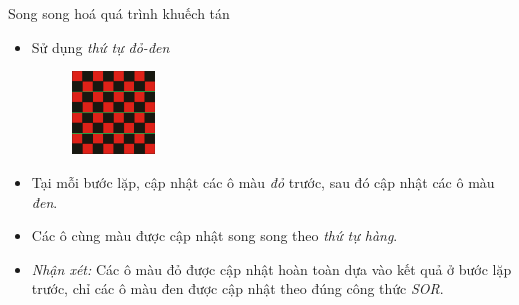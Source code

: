 \begin{frame}{Song song hoá quá trình khuếch tán}
\begin{itemize}
    \item Sử dụng \emph{thứ tự đỏ-đen}
    \begin{figure}[H]
        \centering
        \includegraphics[width=22mm]{img/red-black-grid.png}
    \end{figure}
	\item Tại mỗi bước lặp, cập nhật các ô màu \emph{đỏ} trước, sau đó cập nhật các ô màu \emph{đen}.
	\item Các ô cùng màu được cập nhật song song theo \emph{thứ tự hàng}.
	\item \emph{Nhận xét:} Các ô màu đỏ được cập nhật hoàn toàn dựa vào kết quả ở bước lặp trước, chỉ các ô màu đen được cập nhật theo đúng công thức \emph{SOR}.
\end{itemize}
\end{frame}